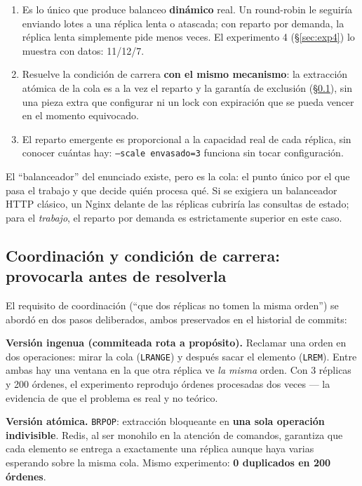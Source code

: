 \documentclass[12pt,a4paper]{article}
\begin{document}
\begin{enumerate}[leftmargin=*]
  \item Es lo único que produce balanceo \textbf{dinámico} real. Un
        round-robin le seguiría enviando lotes a una réplica lenta o atascada;
        con reparto por demanda, la réplica lenta simplemente pide menos veces.
        El experimento 4 (§\ref{sec:exp4}) lo muestra con datos: 11/12/7.
  \item Resuelve la condición de carrera \textbf{con el mismo mecanismo}: la
        extracción atómica de la cola es a la vez el reparto y la garantía de
        exclusión (§\ref{sec:carrera}), sin una pieza extra que configurar ni
        un lock con expiración que se pueda vencer en el momento equivocado.
  \item El reparto emergente es proporcional a la capacidad real de cada
        réplica, sin conocer cuántas hay: \texttt{--scale envasado=3} funciona
        sin tocar configuración.
\end{enumerate}

El ``balanceador'' del enunciado existe, pero es la cola: el punto único por
el que pasa el trabajo y que decide quién procesa qué. Si se exigiera un
balanceador HTTP clásico, un Nginx delante de las réplicas cubriría las
consultas de estado; para el \emph{trabajo}, el reparto por demanda es
estrictamente superior en este caso.

\subsection{Coordinación y condición de carrera: provocarla antes de resolverla}
\label{sec:carrera}

El requisito de coordinación (``que dos réplicas no tomen la misma orden'') se
abordó en dos pasos deliberados, ambos preservados en el historial de commits:

\textbf{Versión ingenua (commiteada rota a propósito).} Reclamar una orden en
dos operaciones: mirar la cola (\texttt{LRANGE}) y después sacar el elemento
(\texttt{LREM}). Entre ambas hay una ventana en la que otra réplica ve
\emph{la misma} orden. Con 3 réplicas y 200 órdenes, el experimento reprodujo
órdenes procesadas dos veces — la evidencia de que el problema es real y no
teórico.

\textbf{Versión atómica.} \texttt{BRPOP}: extracción bloqueante en \textbf{una
sola operación indivisible}. Redis, al ser monohilo en la atención de
comandos, garantiza que cada elemento se entrega a exactamente una réplica
aunque haya varias esperando sobre la misma cola. Mismo experimento:
\textbf{0 duplicados en 200 órdenes}.
\end{document}
